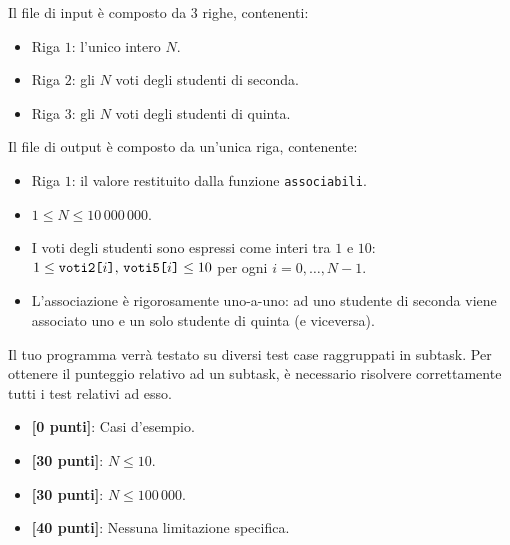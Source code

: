 Il file di input è composto da $3$ righe, contenenti:
\begin{itemize}[nolistsep,itemsep=2mm]
\item Riga $1$: l'unico intero $N$.
\item Riga $2$: gli $N$ voti degli studenti di seconda.
\item Riga $3$: gli $N$ voti degli studenti di quinta.
\end{itemize}

Il file di output è composto da un'unica riga, contenente:
\begin{itemize}[nolistsep,itemsep=2mm]
\item Riga $1$: il valore restituito dalla funzione \texttt{associabili}.
\end{itemize}



\Constraints

\begin{itemize}[nolistsep, itemsep=2mm]
	\item $1 \le N \le 10\,000\,000$.
        \item I voti degli studenti sono espressi come interi tra $1$ e $10$: $1 \le \text{\texttt{voti2[$i$]}, \texttt{voti5[$i$]}} \le 10$ per ogni $i=0,\ldots, N-1$.
	\item L'associazione è rigorosamente uno-a-uno: ad uno studente di seconda viene associato uno e un solo studente di quinta (e viceversa).
\end{itemize}



\Scoring

Il tuo programma verrà testato su diversi test case raggruppati in subtask.
Per ottenere il punteggio relativo ad un subtask, è necessario risolvere correttamente tutti i test relativi ad esso.

\begin{itemize}[nolistsep,itemsep=2mm]
  \item \textbf{ [\phantom{0}0 punti]}: Casi d'esempio.
  \item \textbf{ [30 punti]}: $N \le 10$.
  \item \textbf{ [30 punti]}: $N \le 100\,000$.
  \item \textbf{ [40 punti]}: Nessuna limitazione specifica.
\end{itemize}

